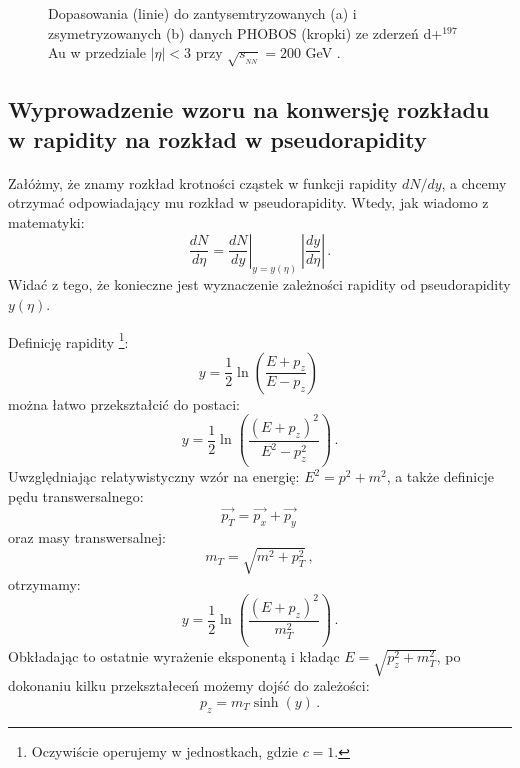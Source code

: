 \documentclass[a4paper,12pt]{article}
\begin{document}
\begin{figure}[H]
\begin{center}
%
\hspace{0.5cm}
%
\caption{Dopasowania (linie) do zantysemtryzowanych (a) i zsymetryzowanych (b) danych PHOBOS (kropki) ze zderzeń d+$^{197}$Au w przedziale $|\eta| < 3$ przy $\sqrt{s_{_{NN}}}=200$ GeV \cite{Back:2004mr}.}\label{fig:Nmp}
\end{center}
\end{figure}


\subsection{Wyprowadzenie wzoru na konwersję rozkładu w rapidity na rozkład w pseudorapidity}
\paragraph{}
Załóżmy, że znamy rozkład krotności cząstek w funkcji rapidity $dN/dy$, a chcemy otrzymać odpowiadający mu rozkład w pseudorapidity. Wtedy, jak wiadomo z matematyki:
\begin{equation}\label{eq:conversion-y-eta}
 \frac{dN}{d\eta} = \left. \frac{dN}{dy} \right|_{y = y(\eta)} \: \left| \frac{dy}{d\eta} \right|\,.
\end{equation}
Widać z tego, że konieczne jest wyznaczenie zależności rapidity od pseudorapidity $y(\eta)$.

Definicję rapidity \footnote{Oczywiście operujemy w jednostkach, gdzie $c=1$.}:
\begin{equation} \label{eq:rapid}
y = \frac{1}{2} \ln \left( \frac{E + p_z}{E - p_z} \right)\,
\end{equation}
można łatwo przekształcić do postaci:
\begin{equation} \label{eq:rapid1}
y = \frac{1}{2} \ln \left( \frac{(E + p_z)^2}{E^2 - p_z^2} \right)\,.
\end{equation}
Uwzględniając relatywistyczny wzór na energię: $E^2 = p^2 + m^2$, a także definicje pędu transwersalnego:
\begin{equation} \label{eq:pt}
\vec{p_T} = \vec{p_x} + \vec{p_y} \,
\end{equation}
oraz masy transwersalnej:
\begin{equation} \label{eq:mt}
m_T = \sqrt{m^2 + p_T^2} \,,
\end{equation}
otrzymamy:
\begin{equation} \label{eq:rapid2}
y = \frac{1}{2} \ln \left( \frac{(E + p_z)^2}{m_T^2} \right)\,.
\end{equation}
Obkładając to ostatnie wyrażenie eksponentą i kładąc $E = \sqrt{p_z^2 + m_T^2}$, po dokonaniu kilku przekształeceń możemy dojść do zależości:
\begin{equation} \label{eq:pz-rapid}
p_z = m_{T} \sinh(y)\,.
\end{equation}
\end{document}
